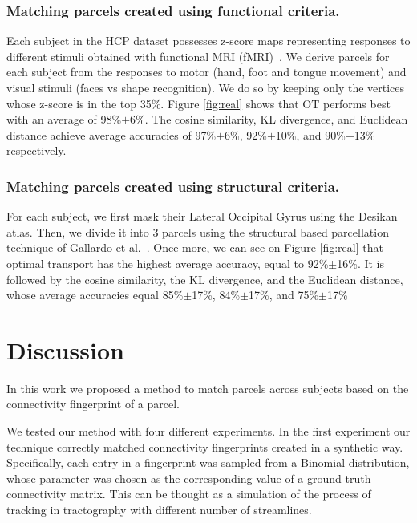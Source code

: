 \subsubsection{Matching parcels created using functional criteria.}
Each subject in the HCP dataset possesses z-score maps representing responses to different stimuli obtained with functional MRI (fMRI)~\cite{Barch2013}. We derive parcels for each subject from the responses to motor (hand, foot and tongue movement) and visual stimuli (faces vs shape recognition). We do so by keeping only the vertices whose z-score is in the top 35\%.
Figure \ref{fig:real} shows that OT performs best with an average of 98\%$\pm$6\%. The cosine similarity, KL divergence, and Euclidean distance achieve average accuracies of 97\%$\pm$6\%, 92\%$\pm$10\%, and 90\%$\pm$13\% respectively.

\subsubsection{Matching parcels created using structural criteria.}
For each subject, we first mask their Lateral Occipital Gyrus using the Desikan atlas. Then, we divide it into 3 parcels using the structural based parcellation technique of Gallardo et al.~\cite{Gallardo2017a}. Once more, we can see on Figure \ref{fig:real} that optimal transport has the highest average accuracy, equal to 92\%$\pm$16\%. It is followed by the cosine similarity, the KL divergence, and the Euclidean distance, whose average accuracies equal 85\%$\pm$17\%, 84\%$\pm$17\%, and 75\%$\pm$17\%

\section{Discussion}
In this work we proposed a method to match parcels across subjects based on the
connectivity fingerprint of a parcel. 

We tested our method with four different experiments. In the first experiment
our technique correctly matched connectivity fingerprints created in a synthetic
way. Specifically, each entry in a fingerprint was sampled from a Binomial
distribution, whose parameter was chosen as the corresponding value of a
ground truth connectivity matrix. This can be thought as a simulation of the
process of tracking in tractography with different number of streamlines.

